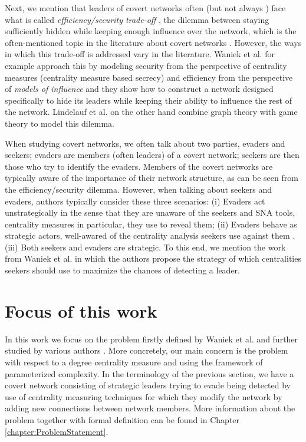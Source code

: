 Next, we mention that leaders of covert networks often (but not always \cite{Fatih2012}) face what is called
\emph{efficiency/security trade-off} \cite{Morselli2007},
the dilemma between staying sufficiently hidden while keeping enough influence over the network,
which is the often-mentioned topic in the literature about covert networks \cite{Crossley2012,Waniek2017,Lindelauf2009}.
However, the ways in which this trade-off is addressed vary in the literature.
Waniek et al. \cite{Waniek2017} for example approach this by modeling security from the perspective of
centrality measures (centrality measure based secrecy) and efficiency from the perspective of \emph{models of influence}
and they show how to construct a network designed specifically to hide its leaders while
keeping their ability to influence the rest of the network.
Lindelauf et al. \cite{Lindelauf2009} on the other hand combine graph theory with game theory to model this dilemma.

When studying covert networks, we often talk about two parties, evaders and seekers;
evaders are members (often leaders) of a covert network;
seekers are then those who try to identify the evaders.
Members of the covert networks are typically aware of the importance of their network structure, as can be seen from
the efficiency/security dilemma.
However, when talking about seekers and evaders, authors typically consider these three scenarios:
(i) Evaders act unstrategically in the sense that they are unaware of
the seekers and SNA tools, centrality measures in particular, they use to reveal them;
(ii) Evaders behave as strategic actors, well-awared of the centrality analysis seekers use against them \cite{Waniek2017,Dey2019,Dey2020}.
(iii) Both seekers and evaders are strategic.
To this end, we mention the work from Waniek et al. \cite[y.~2021]{Waniek2021} in which the authors propose
the strategy of which centralities seekers should use to maximize the chances of detecting
a leader.


\section{Focus of this work}\label{section:focusOfThisWork}

In this work we focus on the \HL problem firstly defined by Waniek et al. \cite{Waniek2017}
and further studied by various authors \cite{Dey2019,Waniek2021,Mohan2023}.
More concretely, our main concern is the \HL problem with respect to a degree centrality measure
and using the framework of parameterized complexity.
In the terminology of the previous section, we have a covert network consisting of strategic leaders trying to
evade being detected by use of centrality measuring techniques
for which they modify the network by adding new connections between network members. 
More information about the problem together with formal definition can be found in Chapter \ref{chapter:ProblemStatement}.
